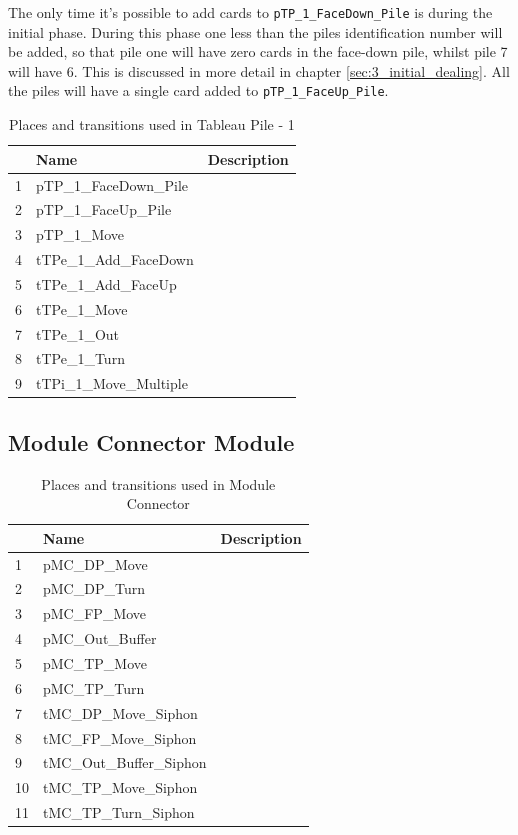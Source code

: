 \documentclass[runningheads,a4paper]{llncs}
\begin{document}
The only time it's possible to add cards to \verb!pTP_1_FaceDown_Pile! is during the initial phase. During this phase one less than the piles identification number will be added, so that pile one will have zero cards in the face-down pile, whilst pile 7 will have 6. This is discussed in more detail in chapter \ref{sec:3_initial_dealing}. All the piles will have a single card added to \verb!pTP_1_FaceUp_Pile!.  
\begin{table}
	\caption{Places and transitions used in Tableau Pile - 1}
	\begin{tabular}{|l|l|l|}
		\hline
		& Name & Description \\
		\hline
		1 & pTP\_1\_FaceDown\_Pile    &  \\ \hline
		2 & pTP\_1\_FaceUp\_Pile      &  \\ \hline
		3 & pTP\_1\_Move              &  \\ \hline
		4 & tTPe\_1\_Add\_FaceDown   &    \\ \hline
		5 & tTPe\_1\_Add\_FaceUp     &    \\ \hline
		6 & tTPe\_1\_Move            &    \\ \hline
		7 & tTPe\_1\_Out             &    \\ \hline
		8 & tTPe\_1\_Turn            &    \\ \hline
		9 & tTPi\_1\_Move\_Multiple  &    \\ \hline
	\end{tabular}
\end{table}
\clearpage
\subsection{Module Connector Module}
\begin{table}
	\caption{Places and transitions used in Module Connector}
	\begin{tabular}{|l|l|l|}
		\hline
		& Name & Description \\
		\hline
		1 & pMC\_DP\_Move             &  \\ \hline
		2 & pMC\_DP\_Turn             &  \\ \hline
		3 & pMC\_FP\_Move             &  \\ \hline
		4 & pMC\_Out\_Buffer          &  \\ \hline
		5 & pMC\_TP\_Move             &  \\ \hline
		6 & pMC\_TP\_Turn             &  \\ \hline
		7 & tMC\_DP\_Move\_Siphon     &  \\ \hline
		8 & tMC\_FP\_Move\_Siphon     &  \\ \hline
		9 & tMC\_Out\_Buffer\_Siphon  &  \\ \hline
		10 & tMC\_TP\_Move\_Siphon     &  \\ \hline
		11 & tMC\_TP\_Turn\_Siphon     &  \\ \hline
	\end{tabular}
\end{table}
\clearpage
\end{document}
